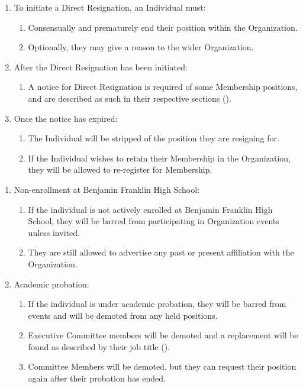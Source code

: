 \begin{enumerate}
	\item To initiate a Direct Resignation, an Individual must:
		\begin{enumerate}
			\item Consensually and prematurely end their position within the Organization.

			\item Optionally, they may give a reason to the wider Organization.
		\end{enumerate}

	\item After the Direct Resignation has been initiated:
		\begin{enumerate}
			\item A notice for Direct Resignation is required of some Membership positions,
				and are described as such in their respective sections ().
		\end{enumerate}

	\item Once the notice has expired:
		\begin{enumerate}
			\item The Individual will be stripped of the position they are resigning for.

			\item If the Individual wishes to retain their Membership in the Organization,
				they will be allowed to re-register for Membership.
		\end{enumerate}
\end{enumerate}

\begin{enumerate}
	\item Non-enrollment at Benjamin Franklin High School:
		\begin{enumerate}
			\item If the individual is not actively enrolled at Benjamin Franklin High
				School, they will be barred from participating in Organization events
				unless invited.

			\item They are still allowed to advertise any past or present affiliation with
				the Organization.
		\end{enumerate}

	\item Academic probation:
		\begin{enumerate}
			\item If the individual is under academic probation, they will be barred
				from events and will be demoted from any held positions.

			\item Executive Committee members will be demoted and a replacement will be
				found as described by their job title ().

			\item Committee Members will be demoted, but they can request their
				position again after their probation has ended.
		\end{enumerate}
\end{enumerate}

